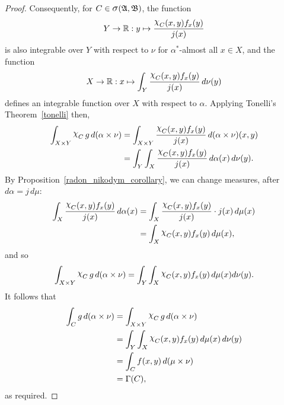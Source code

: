 \documentclass[
twoside=true,
paper=letter,
fontsize=9pt,
pagesize=auto,
leqno,
openany,
headsepline,
overfullrule,
]{scrbook}
\theoremstyle{plain}
\theoremstyle{plain}
\theoremstyle{definition}
\theoremstyle{bfnoteitalic}
\theoremstyle{bfnoteroman}
\newcommand{\sigalg}[1]{\mathfrak{#1}}
\newcommand{\sagb}{\mathop{\hbox{\large{$\sigma$}}}\nolimits}
\newcommand{\charfunction}[1]{\mathop{{\raisebox{2pt}{$\chi$}}_{#1}}}
\newcommand{\R}{\mathbb{R}}
\newcommand{\sigmaalgebra}{\sigalg{A}}
\newcommand{\sigmaalgebraii}{\sigalg{B}}
\newcommand{\productsig}[2]{\sagb(#1,#2)}
\newcommand{\funcj}{j}
\newcommand{\function}{f}
\newcommand{\functionii}{g}
\newcommand{\measurespace}{X}
\newcommand{\measurespaceii}{Y}
\newcommand{\mspaceelt}{x}
\newcommand{\mspaceeltii}{y}
\newcommand{\measure}{\mu}
\newcommand{\measureii}{\nu}
\newcommand{\setiii}{C}
\newcommand{\measonprod}{\Gamma}%
\newcommand{\marginalone}{\alpha}%
\begin{document}
\begin{proof}
Consequently, for $\setiii\in\productsig{\sigmaalgebra}{\sigmaalgebraii}$, 
the function
\[
\measurespaceii\to\R :
\mspaceeltii \mapsto
\frac{\charfunction{\setiii}(\mspaceelt,\mspaceeltii)
\function_\mspaceelt(\mspaceeltii)}
{\funcj(\mspaceelt)}
\]
is also integrable over $\measurespaceii$ with respect to $\measureii$ for 
$\marginalone^*$-almost all $\mspaceelt\in\measurespace$,
and the function
\[
\measurespace\to\R :
\mspaceelt \mapsto 
\int_\measurespaceii 
\frac{
\charfunction{\setiii}(\mspaceelt,\mspaceeltii) 
\function_\mspaceelt(\mspaceeltii)}{\funcj(\mspaceelt)} 
\, d\measureii(\mspaceeltii)
\]
defines an integrable function over $\measurespace$ with respect to 
$\marginalone$.
Applying Tonelli's Theorem~\ref{tonelli} then,
\begin{align*}
\int_{\measurespace\times\measurespaceii}
\charfunction{\setiii}
\functionii
\, d(\marginalone\times\measureii)
& =
\int_{\measurespace\times\measurespaceii}
\frac{
\charfunction{\setiii}(\mspaceelt,\mspaceeltii) 
\function_\mspaceelt(\mspaceeltii)}
{\funcj(\mspaceelt)} 
\, d(\marginalone\times\measureii)(\mspaceelt,\mspaceeltii)
\\
& =
\int_\measurespaceii
\int_\measurespace 
\frac{
\charfunction{\setiii}(\mspaceelt,\mspaceeltii) 
\function_\mspaceelt(\mspaceeltii)}{\funcj(\mspaceelt)} 
\, d\marginalone(\mspaceelt)
\, d\measureii(\mspaceeltii).
\end{align*}
By Proposition~\ref{radon_nikodym_corollary}, we can change measures, after
$d\marginalone = \funcj \, d\measure$:
\begin{align*}
\int_\measurespace 
\frac{
\charfunction{\setiii}(\mspaceelt,\mspaceeltii) 
\function_\mspaceelt(\mspaceeltii)}{\funcj(\mspaceelt)} 
\, d\marginalone(\mspaceelt)
& =
\int_\measurespace 
\frac{
\charfunction{\setiii}(\mspaceelt,\mspaceeltii) 
\function_\mspaceelt(\mspaceeltii)}{\funcj(\mspaceelt)} 
\cdot \funcj(\mspaceelt)
\, d\measure(\mspaceelt)
\\
& =
\int_\measurespace 
\charfunction{\setiii}(\mspaceelt,\mspaceeltii) 
\function_\mspaceelt(\mspaceeltii)
\, d\measure(\mspaceelt),
\end{align*}
and so
\[
\int_{\measurespace\times\measurespaceii}
\charfunction{\setiii}
\functionii
\, d(\marginalone\times\measureii)
=
\int_\measurespaceii
\int_\measurespace
\charfunction{\setiii}(\mspaceelt,\mspaceeltii)
\function_\mspaceelt(\mspaceeltii)
\, d\measure(\mspaceelt)
d\measureii(\mspaceeltii).
\]
It follows that
\begin{align*}
\int_\setiii \functionii
\,d(\marginalone\times\measureii)
& = 
\int_{\measurespace\times\measurespaceii}
\charfunction{\setiii}
\functionii
\, d(\marginalone\times\measureii)
\\
& =
\int_\measurespaceii
\int_\measurespace 
\charfunction{\setiii}(\mspaceelt,\mspaceeltii) 
\function_\mspaceelt(\mspaceeltii)
\, d\measure(\mspaceelt)
\, d\measureii(\mspaceeltii)
\\
& =
\int_{\setiii} 
\function(\mspaceelt,\mspaceeltii)
\, d(\measure\times\measureii)
\\
& =
\measonprod(\setiii),
\end{align*}
as required.


\end{proof}
\end{document}
